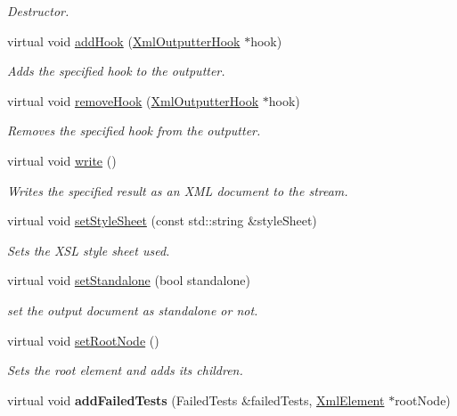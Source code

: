 \begin{DoxyCompactItemize}
\begin{DoxyCompactList}\small\item\em Destructor. \end{DoxyCompactList}\item 
virtual void \hyperlink{class_xml_outputter_a5ecb9d974d3fbfe46324637462edb408}{add\-Hook} (\hyperlink{class_xml_outputter_hook}{Xml\-Outputter\-Hook} $\ast$hook)
\begin{DoxyCompactList}\small\item\em Adds the specified hook to the outputter. \end{DoxyCompactList}\item 
virtual void \hyperlink{class_xml_outputter_ac4659712ab6b0f168119a22fbdb70255}{remove\-Hook} (\hyperlink{class_xml_outputter_hook}{Xml\-Outputter\-Hook} $\ast$hook)
\begin{DoxyCompactList}\small\item\em Removes the specified hook from the outputter. \end{DoxyCompactList}\item 
virtual void \hyperlink{class_xml_outputter_a816f0010b840d445616c67152ac98d57}{write} ()
\begin{DoxyCompactList}\small\item\em Writes the specified result as an X\-M\-L document to the stream. \end{DoxyCompactList}\item 
virtual void \hyperlink{class_xml_outputter_af6e681ba18061b5b8dd6f37614ab556e}{set\-Style\-Sheet} (const std\-::string \&style\-Sheet)
\begin{DoxyCompactList}\small\item\em Sets the X\-S\-L style sheet used. \end{DoxyCompactList}\item 
virtual void \hyperlink{class_xml_outputter_aee5fd34688999cef1d04e48b4e9b695e}{set\-Standalone} (bool standalone)
\begin{DoxyCompactList}\small\item\em set the output document as standalone or not. \end{DoxyCompactList}\item 
virtual void \hyperlink{class_xml_outputter_a902bd7f9c9968ea311e4da3437a37b3e}{set\-Root\-Node} ()
\begin{DoxyCompactList}\small\item\em Sets the root element and adds its children. \end{DoxyCompactList}\item 
\hypertarget{class_xml_outputter_a8675cbea5b79eea10f41d0ab05379421}{virtual void {\bfseries add\-Failed\-Tests} (Failed\-Tests \&failed\-Tests, \hyperlink{class_xml_element}{Xml\-Element} $\ast$root\-Node)}\label{class_xml_outputter_a8675cbea5b79eea10f41d0ab05379421}


\end{DoxyCompactItemize}
